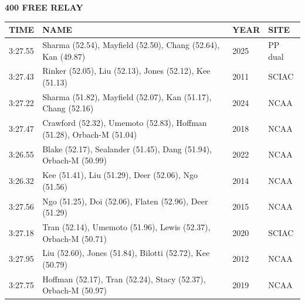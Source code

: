 \begin{table}[H]
\centering
\begin{minipage}[t]{0.6\textwidth}
\centering
\textbf{400 FREE RELAY}\\[0.1cm]
\begin{tabular}{@{}p{1.8cm}p{2.8cm}p{1.2cm}p{1.4cm}@{}}
\hline
    \textbf{TIME} & \textbf{NAME} & \textbf{YEAR} & \textbf{SITE} \\
\hline
    3:27.55 & Sharma (52.54), Mayfield (52.50), Chang (52.64), Kan (49.87) & 2025 & PP dual \\
    3:27.43 & Rinker (52.05), Liu (52.13), Jones (52.12), Kee (51.13) & 2011 & SCIAC \\
    3:27.22 & Sharma (51.82), Mayfield (52.07), Kan (51.17), Chang (52.16) & 2024 & NCAA \\
    3:27.47 & Crawford (52.32), Umemoto (52.83), Hoffman (51.28), Orbach-M (51.04) & 2018 & NCAA \\
    3:26.55 & Blake (52.17), Sealander (51.45), Dang (51.94), Orbach-M (50.99) & 2022 & NCAA \\
    3:26.32 & Kee (51.41), Liu (51.29), Deer (52.06), Ngo (51.56) & 2014 & NCAA \\
    3:27.56 & Ngo (51.25), Doi (52.06), Flaten (52.96), Deer (51.29) & 2015 & NCAA \\
    3:27.18 & Tran (52.14), Umemoto (51.96), Lewis (52.37), Orbach-M (50.71) & 2020 & SCIAC \\
    3:27.95 & Liu (52.60), Jones (51.84), Bilotti (52.72), Kee (50.79) & 2012 & NCAA \\
    3:27.75 & Hoffman (52.17), Tran (52.24), Stacy (52.37), Orbach-M (50.97) & 2019 & NCAA \\
\hline
\end{tabular}
\end{minipage}
\end{table}

